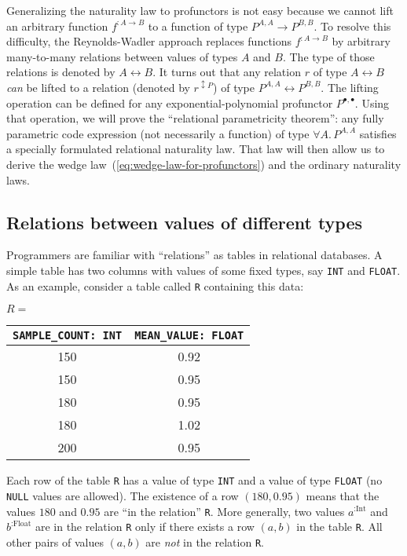 Generalizing the naturality law to profunctors is not easy because
we cannot lift an arbitrary function $f^{:A\rightarrow B}$ to a function
of type $P^{A,A}\rightarrow P^{B,B}$. To resolve this difficulty,
the Reynolds-Wadler approach replaces functions $f^{:A\rightarrow B}$
by arbitrary many-to-many relations between values of types $A$ and
$B$. The type of those relations is denoted by $A\leftrightarrow B$.
It turns out that any relation $r$ of type $A\leftrightarrow B$
\emph{can} be lifted to a relation (denoted by $r^{\updownarrow P}$)
of type $P^{A,A}\leftrightarrow P^{B,B}$. The lifting operation can
be defined for any exponential-polynomial profunctor $P^{\bullet,\bullet}$.
Using that operation, we will prove the \textsf{``}relational parametricity
theorem\textsf{''}: any fully parametric code expression (not necessarily
a function) of type $\forall A.\,P^{A,A}$ satisfies a specially formulated
relational naturality law. That law will then allow us to derive the
wedge law~(\ref{eq:wedge-law-for-profunctors}) and the ordinary
naturality laws.

\subsection{Relations between values of different types}

Programmers are familiar with \textsf{``}relations\textsf{''} as tables in relational
databases. A simple table has two columns with values of some fixed
types, say \lstinline!INT! and \lstinline!FLOAT!. As an example,
consider a table called \lstinline!R! containing this data:
\begin{center}
$R=$ %
\begin{tabular}{|c|c|}
\hline 
\lstinline!SAMPLE_COUNT: INT! & \lstinline!MEAN_VALUE: FLOAT!\tabularnewline
\hline 
\hline 
{\footnotesize{}150} & {\footnotesize{}0.92}\tabularnewline
\hline 
{\footnotesize{}150} & {\footnotesize{}0.95}\tabularnewline
\hline 
{\footnotesize{}180} & {\footnotesize{}0.95}\tabularnewline
\hline 
{\footnotesize{}180} & {\footnotesize{}1.02}\tabularnewline
\hline 
{\footnotesize{}200} & {\footnotesize{}0.95}\tabularnewline
\hline 
\end{tabular}
\par\end{center}

Each row of the table \lstinline!R! has a value of type \lstinline!INT!
and a value of type \lstinline!FLOAT! (no \lstinline!NULL! values
are allowed). The existence of a row $\left(180,0.95\right)$ means
that the values $180$ and $0.95$ are \textsf{``}in the relation\textsf{''} \lstinline!R!.
More generally, two values $a^{:\text{Int}}$ and $b^{:\text{Float}}$
are in the relation \lstinline!R! only if there exists a row $\left(a,b\right)$
in the table \lstinline!R!. All other pairs of values $\left(a,b\right)$
are \emph{not} in the relation \lstinline!R!. 

